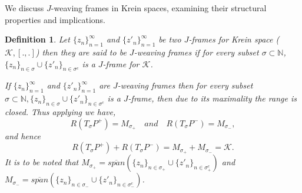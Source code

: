 \documentclass[article,12pt]{amsart}
\newtheorem{defn}[thm]{Definition}
\newtheorem{re}[thm]{Remark}
\begin{document}

We discuss $J$-weaving frames in Krein spaces, examining their structural properties and implications.

\begin{defn}\label{J-weaving}
	Let $\{z_n\}^\infty_{n= 1}$ and $\{z'_n\}^\infty_{n= 1}$ be two $J$-frames for Krein space ($\mathcal{K}, [., .]$) then they are said to be $J$-weaving frames if for every subset $\sigma \subset{\mathbb{N}}$,  $\{z_n\}_{n \in \sigma} \cup \{z'_n\}_{n \in \sigma^c}$ is a $J$-frame for $\mathcal{K}$.
	
If $\{z_n\}^\infty_{n= 1}$ and $\{z'_n\}^\infty_{n= 1}$ are $J$-weaving frames then for every subset $\sigma \subset\mathbb{N}, \{z_n\}_{n \in \sigma}  \cup  \{z'_n\}_{n \in \sigma^c}$ is a $J$-frame, then due to its maximality the range is closed. Thus applying \cite[Corollary 1.5.2]{An79} we have, $$R(T_{\sigma}P^+) = M_{\sigma_+} \quad and \quad R(T_{\sigma}P^-) = M_{\sigma_-} ,$$ and hence
	$$R(T_{\sigma}P^+) +R(T_{\sigma}P^-) = M_{\sigma_+} + M_{\sigma_-} = \mathcal{K}.$$ It is to be noted that $M_{\sigma_+}  = \overline{span} (\{z_n\}_{n \in \sigma_+} \cup \{z'_n\}_{n \in \sigma^c_+})$ and $M_{\sigma_-}  = \overline{span} (\{z_n\}_{n \in \sigma_-} \cup \{z'_n\}_{n \in \sigma^c_-})$.
\end{defn}

	
\end{document}
